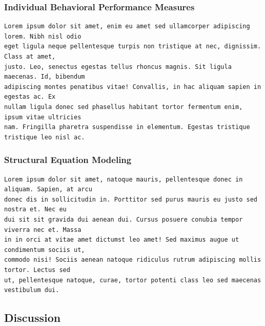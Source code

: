 \documentclass{article}
\begin{document}
\hypertarget{individual-behavioral-performance-measures}{%
\subsubsection{Individual Behavioral Performance
Measures}\label{individual-behavioral-performance-measures}}

\begin{verbatim}
Lorem ipsum dolor sit amet, enim eu amet sed ullamcorper adipiscing lorem. Nibh nisl odio
eget ligula neque pellentesque turpis non tristique at nec, dignissim. Class at amet,
justo. Leo, senectus egestas tellus rhoncus magnis. Sit ligula maecenas. Id, bibendum
adipiscing montes penatibus vitae! Convallis, in hac aliquam sapien in egestas ac. Ex
nullam ligula donec sed phasellus habitant tortor fermentum enim, ipsum vitae ultricies
nam. Fringilla pharetra suspendisse in elementum. Egestas tristique tristique leo nisl ac.
\end{verbatim}

\hypertarget{structural-equation-modeling-1}{%
\subsubsection{Structural Equation
Modeling}\label{structural-equation-modeling-1}}

\begin{verbatim}
Lorem ipsum dolor sit amet, natoque mauris, pellentesque donec in aliquam. Sapien, at arcu
donec dis in sollicitudin in. Porttitor sed purus mauris eu justo sed nostra et. Nec eu
dui sit sit gravida dui aenean dui. Cursus posuere conubia tempor viverra nec et. Massa
in in orci at vitae amet dictumst leo amet! Sed maximus augue ut condimentum sociis ut,
commodo nisi! Sociis aenean natoque ridiculus rutrum adipiscing mollis tortor. Lectus sed
ut, pellentesque natoque, curae, tortor potenti class leo sed maecenas vestibulum dui.
\end{verbatim}

\hypertarget{discussion}{%
\subsection{Discussion}\label{discussion}}
\end{document}
